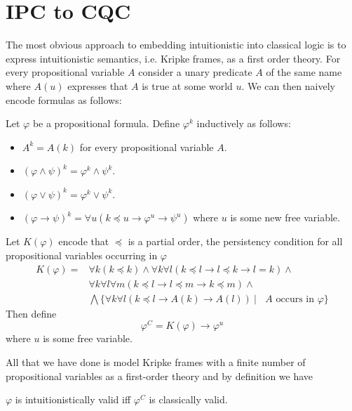 \documentclass[a4paper,UKenglish,cleveref, autoref, thm-restate]{lipics-v2021}
\begin{document}
\section{IPC to CQC}

The most obvious approach to embedding intuitionistic into classical logic is to express intuitionistic semantics, i.e. Kripke frames, as a first order theory. For every propositional variable $A$ consider a unary predicate $A$ of the same name where $A(u)$ expresses that $A$ is true at some world $u$. We can then naively encode formulas as follows:

\begin{definition}
	Let $\varphi$ be a propositional formula. Define $\varphi^{k}$ inductively as follows:
	\begin{itemize}
		\item $A^{k} = A(k)$ for every propositional variable $A$.
		\item $(\varphi\wedge\psi)^k = \varphi^k\wedge\psi^k$.
		\item $(\varphi\vee\psi)^k = \varphi^k\vee\psi^k$.
		\item $(\varphi\to \psi)^k = \forall u(k\preceq u\to\varphi^{u}\to\psi^{u})$ where $u$ is some new free variable.
	\end{itemize}
	Let $K(\varphi)$ encode that $\preceq$ is a partial order, the persistency condition for all propositional variables occurring in $\varphi$
	\begin{align*}
		K(\varphi) = &\forall k(k\preceq k)\wedge \forall k\forall l(k\preceq l\to l\preceq k\to l = k) \wedge \\&\forall k\forall l\forall m(k\preceq l \to l\preceq m\to k\preceq m)\wedge\\&\bigwedge \{\forall k\forall l(k\preceq l\to A(k)\to A(l))\:|\: \text{ $A$ occurs in $\varphi$}\}
	\end{align*}
	Then define
	$$\varphi^{C} = K(\varphi)\to \varphi^{u}$$
	where $u$ is some free variable.
\end{definition}

All that we have done is model Kripke frames with a finite number of propositional variables as a first-order theory and by definition we have

\begin{lemma}
	$\varphi$ is intuitionistically valid iff $\varphi^C$ is classically valid.
\end{lemma}
\end{document}
